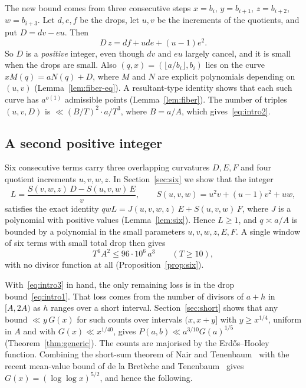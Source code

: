 \documentclass[11pt]{amsart}
\theoremstyle{definition}
\theoremstyle{remark}
\begin{document}
The new bound comes from three consecutive steps $x=b_i$, $y=b_{i+1}$, $z=b_{i+2}$,
$w=b_{i+3}$. Let $d,e,f$ be the drops, let $u,v$ be the increments of the quotients, and put
$D=dv-eu$. Then
\begin{equation}\label{eq:intro-curv}
D\,z=df+ude+(u-1)e^2 .
\end{equation}
So $D$ is a \emph{positive} integer, even though $dv$ and $eu$ largely cancel, and it is small
when the drops are small. Also $(q,x)=(\lfloor a/b_i\rfloor,b_i)$ lies on the curve
$xM(q)=aN(q)+D$, where $M$ and $N$ are explicit polynomials depending on $(u,v)$
(Lemma~\ref{lem:fiber-eq}). A resultant-type identity shows that each such curve has
$a^{o(1)}$ admissible points (Lemma~\ref{lem:fiber}). The number of triples $(u,v,D)$ is
$\ll (B/T)^2\cdot a/T^3$, where $B=a/A$, which gives~\eqref{eq:intro2}.

\subsection*{A second positive integer}
Six consecutive terms carry three overlapping curvatures $D,E,F$ and four quotient increments
$u,v,w,z$. In Section~\ref{sec:six} we show that the integer
\[
L=\frac{S(v,w,z)\,D-S(u,v,w)\,E}{v},\qquad S(u,v,w)=u^2v+(u-1)v^2+uw,
\]
satisfies the exact identity $qwL=J(u,v,w,z)\,E+S(u,v,w)\,F$, where $J$ is a polynomial with
positive values (Lemma~\ref{lem:six}). Hence $L\ge1$, and $q\asymp a/A$ is bounded by a
polynomial in the small parameters $u,v,w,z,E,F$. A single window of six terms with small total
drop then gives
\begin{equation}\label{eq:intro3}
T^6A^2\le 96\cdot10^6\,a^3\qquad(T\ge10),
\end{equation}
with no divisor function at all (Proposition~\ref{prop:six}).

With~\eqref{eq:intro3} in hand, the only remaining loss is in the drop bound~\eqref{eq:intro1}. That
loss comes from the number of divisors of $a+h$ in $[A,2A)$ as $h$ ranges over a short interval.
Section~\ref{sec:short} shows that any bound $\ll y\,G(x)$ for such counts over intervals
$(x,x+y]$ with $y\ge x^{1/4}$, uniform in $A$ and with $G(x)\ll x^{1/40}$, gives
$P(a,b)\ll a^{3/10}G(a)^{1/5}$ (Theorem~\ref{thm:generic}).
The counts are majorised by the Erd\H{o}s--Hooley function. Combining the short-sum theorem of
Nair and Tenenbaum~\cite{NT} with the recent mean-value bound of de la Bret\`eche and
Tenenbaum~\cite{BT} gives $G(x)=(\log\log x)^{5/2}$, and hence the following.
\end{document}
